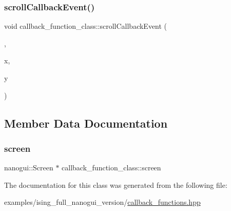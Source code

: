 \subsubsection{\texorpdfstring{scroll\+Callback\+Event()}{scrollCallbackEvent()}\hspace{0.1cm}{\footnotesize\ttfamily [2/2]}}
{\footnotesize\ttfamily void callback\+\_\+function\+\_\+class\+::scroll\+Callback\+Event (\begin{DoxyParamCaption}\item[{G\+L\+F\+Wwindow $\ast$}]{,  }\item[{double}]{x,  }\item[{double}]{y }\end{DoxyParamCaption})\hspace{0.3cm}{\ttfamily [inline]}}



\subsection{Member Data Documentation}
\mbox{\label{classcallback__function__class_a0f80d6d7576b75c68d71044bdb61c8f0}} 
\subsubsection{\texorpdfstring{screen}{screen}}
{\footnotesize\ttfamily nanogui\+::\+Screen $\ast$ callback\+\_\+function\+\_\+class\+::screen\hspace{0.3cm}{\ttfamily [private]}}



The documentation for this class was generated from the following file\+:\begin{DoxyCompactItemize}
\item 
examples/ising\+\_\+full\+\_\+nanogui\+\_\+version/\mbox{\hyperlink{ising__full__nanogui__version_2callback__functions_8hpp}{callback\+\_\+functions.\+hpp}}\end{DoxyCompactItemize}
